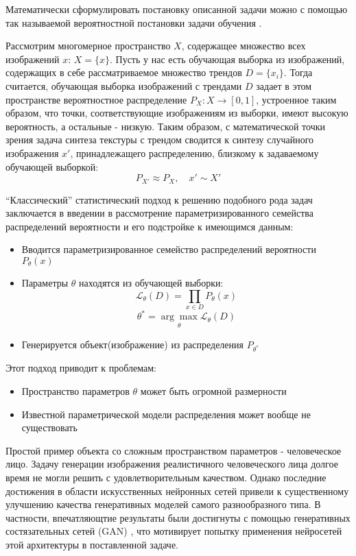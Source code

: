 Математически сформулировать постановку описанной задачи можно с помощью так называемой вероятностной постановки задачи обучения \cite{Voron-ML, GAN-original}.

Рассмотрим многомерное пространство $X$, содержащее множество всех изображений $x$: $X = \{x\}$. Пусть у нас есть обучающая выборка из изображений, содержащих в себе рассматриваемое множество трендов $D = \{x_i\}$. Тогда считается, обучающая выборка изображений с трендами $D$ задает в этом пространстве вероятностное распределение $P_X : X \longrightarrow [0,1]$, устроенное таким образом, что точки, соответствующие изображениям из выборки, имеют высокую вероятность, а остальные - низкую. Таким образом, с математической точки зрения задача синтеза текстуры с трендом сводится к синтезу случайного изображения $x'$, принадлежащего распределению, близкому к задаваемому обучающей выборкой:
$$ P_{X'} \approx P_X, \quad x' \sim X'$$
	
``Классический'' статистический подход к решению подобного рода задач заключается в введении в рассмотрение параметризированного семейства распределений вероятности и его подстройке к имеющимся данным:
	
\begin{itemize}
	\item Вводится параметризированное семейство распределений вероятности $P_{\theta}(x)$
	\item Параметры $\theta$ находятся из обучающей выборки:
		$$ \mathcal{L}_{\theta}(D) = \prod_{x \in D} P_{\theta}(x) $$
		$$ \theta^{*} = \underset{\theta}{\arg\max} \mathcal{L}_{\theta}(D)$$
	\item Генерируется объект(изображение) из распределения $ P_{\theta^{*}}$
\end{itemize}
	
Этот подход приводит к проблемам:
	
\begin{itemize}
	\item Пространство параметров $\theta$ может быть огромной размерности
	\item Известной параметрической модели распределения может вообще не существовать
\end{itemize}
	
Простой пример объекта со сложным пространством параметров - человеческое лицо. Задачу генерации изображения реалистичного человеческого лица долгое время не могли решить с удовлетворительным качеством. Однако последние достижения в области искусственных нейронных сетей привели к существенному улучшению качества генеративных моделей самого разнообразного типа. В частности, впечатляющтие результаты были достигнуты с помощью генеративных состязательных сетей (GAN) \cite{cGAN, cGAN-face, EBGAN, BEGAN}, что мотивирует попытку применения нейросетей этой архитектуры в поставленной задаче.